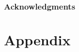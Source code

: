 \documentclass[conference]{IEEEtran}
\begin{document}
\subsubsection*{Acknowledgments}



\newpage
\section{Appendix}
\label{appendix}






  


  
\end{document}
